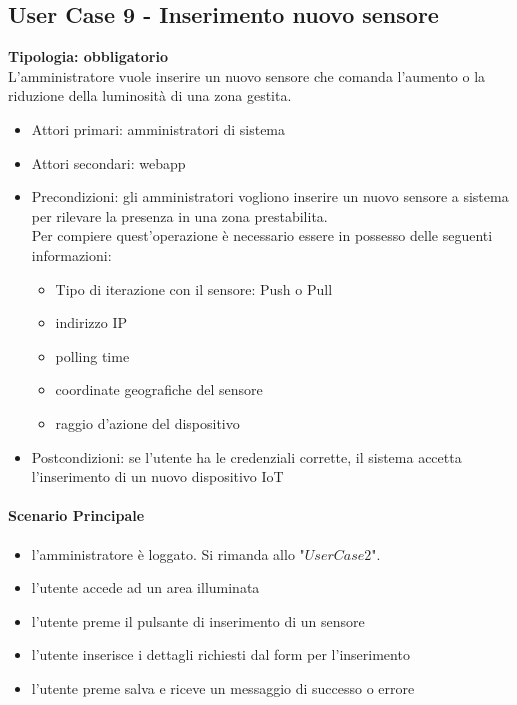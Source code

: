 \documentclass[12pt]{article}
\begin{document}
\subsection{User Case 9 - Inserimento nuovo sensore}
\textbf{Tipologia: obbligatorio}\\
L'amministratore vuole inserire un nuovo sensore che comanda l'aumento o la riduzione della luminosità di una zona gestita.
\begin{itemize}
	\item Attori primari: amministratori di sistema
	\item Attori secondari: webapp
	\item Precondizioni: gli amministratori vogliono inserire un nuovo sensore a sistema per rilevare la presenza in una zona prestabilita.\\
	 Per compiere quest'operazione è necessario essere in possesso delle seguenti informazioni: 
	\begin{itemize}
		\item Tipo di iterazione con il sensore: Push o Pull
		\item indirizzo IP
		\item polling time
		\item coordinate geografiche del sensore
		\item raggio d'azione del dispositivo
	\end{itemize}
	\item Postcondizioni: se l'utente ha le credenziali corrette, il sistema accetta l'inserimento di un nuovo dispositivo IoT
\end{itemize}
\paragraph{Scenario Principale}
\begin{itemize}
	\item l'amministratore è loggato. Si rimanda allo "$User Case 2$".
	\item l'utente accede ad un area illuminata
	\item l'utente preme il pulsante di inserimento di un sensore
	\item l'utente inserisce i dettagli richiesti dal form per l'inserimento
	\item l'utente preme salva e riceve un messaggio di successo o errore
\end{itemize}
\end{document}
